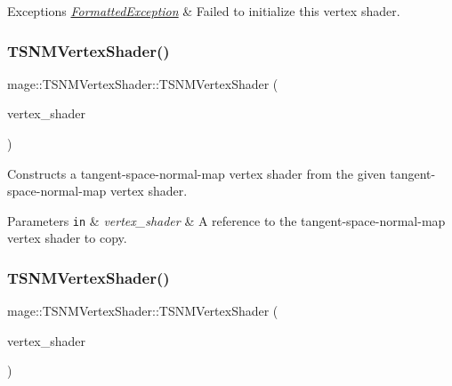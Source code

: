 \begin{DoxyExceptions}{Exceptions}
{\em \hyperlink{structmage_1_1_formatted_exception}{Formatted\+Exception}} & Failed to initialize this vertex shader. \\
\hline
\end{DoxyExceptions}
\hypertarget{classmage_1_1_t_s_n_m_vertex_shader_abd4a1b3bb7dacdc2fc602491795008b1}{}\label{classmage_1_1_t_s_n_m_vertex_shader_abd4a1b3bb7dacdc2fc602491795008b1} 
\subsubsection{\texorpdfstring{T\+S\+N\+M\+Vertex\+Shader()}{TSNMVertexShader()}\hspace{0.1cm}{\footnotesize\ttfamily [3/4]}}
{\footnotesize\ttfamily mage\+::\+T\+S\+N\+M\+Vertex\+Shader\+::\+T\+S\+N\+M\+Vertex\+Shader (\begin{DoxyParamCaption}\item[{const \hyperlink{classmage_1_1_t_s_n_m_vertex_shader}{T\+S\+N\+M\+Vertex\+Shader} \&}]{vertex\+\_\+shader }\end{DoxyParamCaption})\hspace{0.3cm}{\ttfamily [delete]}}

Constructs a tangent-\/space-\/normal-\/map vertex shader from the given tangent-\/space-\/normal-\/map vertex shader.


\begin{DoxyParams}[1]{Parameters}
\mbox{\tt in}  & {\em vertex\+\_\+shader} & A reference to the tangent-\/space-\/normal-\/map vertex shader to copy. \\
\hline
\end{DoxyParams}
\hypertarget{classmage_1_1_t_s_n_m_vertex_shader_a3c4a072e8a907437e4dfc15835253da5}{}\label{classmage_1_1_t_s_n_m_vertex_shader_a3c4a072e8a907437e4dfc15835253da5} 
\subsubsection{\texorpdfstring{T\+S\+N\+M\+Vertex\+Shader()}{TSNMVertexShader()}\hspace{0.1cm}{\footnotesize\ttfamily [4/4]}}
{\footnotesize\ttfamily mage\+::\+T\+S\+N\+M\+Vertex\+Shader\+::\+T\+S\+N\+M\+Vertex\+Shader (\begin{DoxyParamCaption}\item[{\hyperlink{classmage_1_1_t_s_n_m_vertex_shader}{T\+S\+N\+M\+Vertex\+Shader} \&\&}]{vertex\+\_\+shader }\end{DoxyParamCaption})\hspace{0.3cm}{\ttfamily [default]}}

